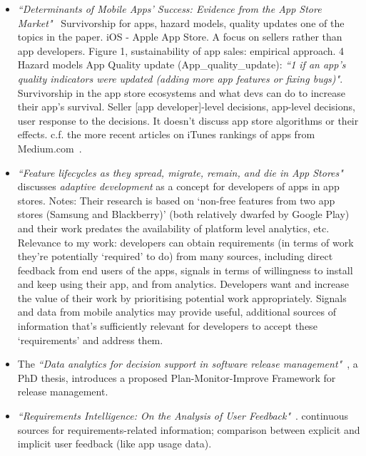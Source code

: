 \begin{itemize}
    
    \item \emph{``Determinants of Mobile Apps' Success: Evidence from the App Store Market"}~\citep{lee2014_determinants_of_mobile_app_success_evidence_from_the_app_store_market} Survivorship for apps, hazard models, quality updates one of the topics in the paper. iOS - Apple App Store. A focus on sellers rather than app developers. Figure 1, sustainability of app sales: empirical approach. 4 Hazard models App Quality update (App\_quality\_update): \emph{``1 if an app’s quality indicators were updated (adding more app features or fixing bugs)"}. Survivorship in the app store ecosystems and what devs can do to increase their app's survival. Seller [app developer]-level decisions, app-level decisions, user response to the decisions. It doesn't discuss app store algorithms or their effects. c.f. the more recent articles on iTunes rankings of apps from Medium.com~\citep{lotan2015_apple_apps_and_algorithmic_glitches, lotan2015_apples_app_charts}.
    
    \item \emph{``Feature lifecycles as they spread, migrate, remain, and die in App Stores"}~\cite{sarro2015_feature_lifecycles_in_appstores} discusses \emph{adaptive development} as a concept for developers of apps in app stores. Notes: Their research is based on `non-free features from two app stores (Samsung and Blackberry)' (both relatively dwarfed by Google Play) and their work predates the availability of platform level analytics, etc. Relevance to my work: developers can obtain requirements (in terms of work they're potentially `required' to do) from many sources, including direct feedback from end users of the apps, signals in terms of willingness to install and keep using their app, and from analytics. Developers want and increase the value of their work by prioritising potential work appropriately. Signals and data from mobile analytics may provide useful, additional sources of information that's sufficiently relevant for developers to accept these `requirements' and address them.
    
    \item The \emph{``Data analytics for decision support in software release management"}~\cite{didar2018data_analytics_phd_thesis}, a PhD thesis, introduces a proposed Plan-Monitor-Improve Framework for release management.

    
    \item \emph{``Requirements Intelligence: On the Analysis of User Feedback"}~\cite{stanik2020_requirements_intelligence_on_the_analysis_of_user_feedback}. continuous sources for requirements-related information; comparison between explicit and implicit user feedback (like app usage data).


\end{itemize}
